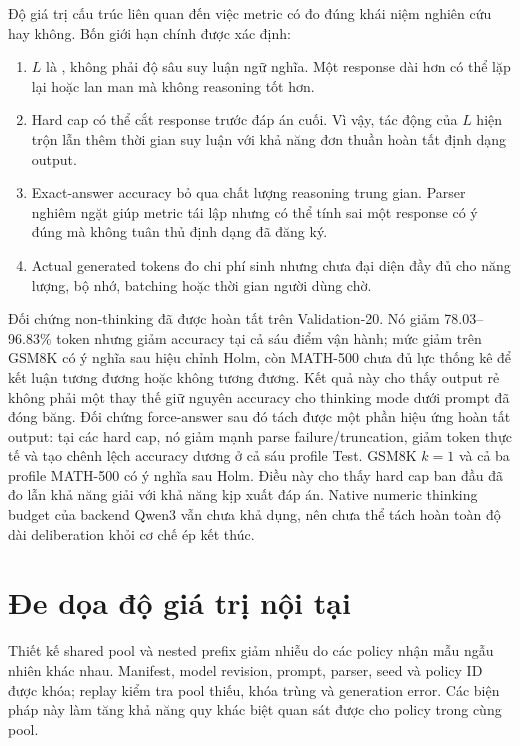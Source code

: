 Độ giá trị cấu trúc liên quan đến việc metric có đo đúng khái niệm nghiên cứu
hay không. Bốn giới hạn chính được xác định:

\begin{enumerate}
  \item $L$ là , không phải độ sâu suy luận ngữ nghĩa.
  Một response dài hơn có thể lặp lại hoặc lan man mà không reasoning tốt hơn.
  \item Hard cap có thể cắt response trước đáp án cuối. Vì vậy, tác động của
  $L$ hiện trộn lẫn thêm thời gian suy luận với khả năng đơn thuần hoàn tất định
  dạng output.
  \item Exact-answer accuracy bỏ qua chất lượng reasoning trung gian. Parser
  nghiêm ngặt giúp metric tái lập nhưng có thể tính sai một response có ý đúng
  mà không tuân thủ định dạng đã đăng ký.
  \item Actual generated tokens đo chi phí sinh nhưng chưa đại diện đầy đủ cho
  năng lượng, bộ nhớ, batching hoặc thời gian người dùng chờ.
\end{enumerate}

Đối chứng non-thinking đã được hoàn tất trên Validation-20. Nó giảm
78.03--96.83\% token nhưng giảm accuracy tại cả sáu điểm vận hành; mức giảm
trên GSM8K có ý nghĩa sau hiệu chỉnh Holm, còn MATH-500 chưa đủ lực thống kê để
kết luận tương đương hoặc không tương đương. Kết quả này cho thấy output rẻ
không phải một thay thế giữ nguyên accuracy cho thinking mode dưới prompt đã
đóng băng. Đối chứng force-answer sau đó tách được một phần hiệu ứng hoàn tất
output: tại các hard cap, nó giảm mạnh parse failure/truncation, giảm token thực
tế và tạo chênh lệch accuracy dương ở cả sáu profile Test. GSM8K $k=1$ và cả
ba profile MATH-500 có ý nghĩa sau Holm. Điều này cho thấy hard cap ban đầu đã
đo lẫn khả năng giải với khả năng kịp xuất đáp án. Native numeric thinking
budget của backend Qwen3 vẫn chưa khả dụng, nên chưa thể tách hoàn toàn độ dài
deliberation khỏi cơ chế ép kết thúc.

\section{Đe dọa độ giá trị nội tại}

Thiết kế shared pool và nested prefix giảm nhiễu do các policy nhận mẫu ngẫu
nhiên khác nhau. Manifest, model revision, prompt, parser, seed và policy ID
được khóa; replay kiểm tra pool thiếu, khóa trùng và generation error. Các biện
pháp này làm tăng khả năng quy khác biệt quan sát được cho policy trong cùng
pool.

